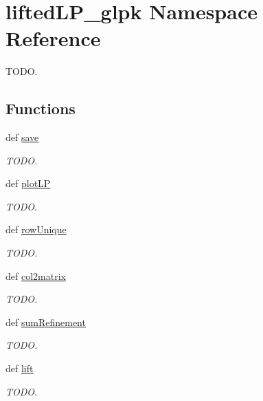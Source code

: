 \hypertarget{namespaceliftedLP__glpk}{\section{lifted\-L\-P\-\_\-glpk Namespace Reference}
\label{namespaceliftedLP__glpk}
}


T\-O\-D\-O.  


\subsection*{Functions}
\begin{DoxyCompactItemize}
\item 
def \hyperlink{namespaceliftedLP__glpk_a4b4cef55ab27b7a9fd1944c17f99cf7a}{save}
\begin{DoxyCompactList}\small\item\em T\-O\-D\-O. \end{DoxyCompactList}\item 
def \hyperlink{namespaceliftedLP__glpk_adeb318ae57c5cca3832fe8e6f8d22768}{plot\-L\-P}
\begin{DoxyCompactList}\small\item\em T\-O\-D\-O. \end{DoxyCompactList}\item 
def \hyperlink{namespaceliftedLP__glpk_a5a80db66e57f2e9d7bcc55774a1b7623}{row\-Unique}
\begin{DoxyCompactList}\small\item\em T\-O\-D\-O. \end{DoxyCompactList}\item 
def \hyperlink{namespaceliftedLP__glpk_a422d938ba2004dd7fc5c07777bf96705}{col2matrix}
\begin{DoxyCompactList}\small\item\em T\-O\-D\-O. \end{DoxyCompactList}\item 
def \hyperlink{namespaceliftedLP__glpk_a041093ff80b59c0b08e2fd5d448e8cd9}{sum\-Refinement}
\begin{DoxyCompactList}\small\item\em T\-O\-D\-O. \end{DoxyCompactList}\item 
def \hyperlink{namespaceliftedLP__glpk_aedaaf3dc2a6daec9e6569ad369e19735}{lift}
\begin{DoxyCompactList}\small\item\em T\-O\-D\-O. \end{DoxyCompactList}\item 

\end{DoxyCompactItemize}

